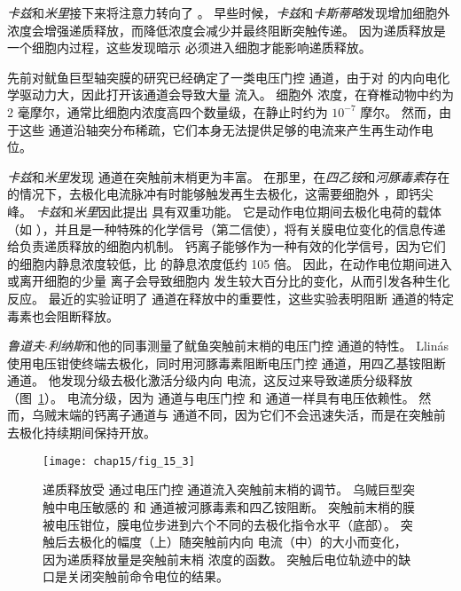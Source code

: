\textit{卡兹}和\textit{米里}接下来将注意力转向了 。
早些时候，\textit{卡兹}和\textit{卡斯蒂略}发现增加细胞外  浓度会增强递质释放，而降低浓度会减少并最终阻断突触传递。
因为递质释放是一个细胞内过程，这些发现暗示  必须进入细胞才能影响递质释放。


先前对鱿鱼巨型轴突膜的研究已经确定了一类电压门控  通道，由于对  的内向电化学驱动力大，因此打开该通道会导致大量  流入。
细胞外  浓度，在脊椎动物中约为 2 毫摩尔，通常比细胞内浓度高四个数量级，在静止时约为 $10^{-7}$ 摩尔。
然而，由于这些  通道沿轴突分布稀疏，它们本身无法提供足够的电流来产生再生动作电位。


\textit{卡兹}和\textit{米里}发现  通道在突触前末梢更为丰富。
在那里，在\textit{四乙铵}和\textit{河豚毒素}存在的情况下，去极化电流脉冲有时能够触发再生去极化，这需要细胞外 ，即钙尖峰。
\textit{卡兹}和\textit{米里}因此提出  具有双重功能。
它是动作电位期间去极化电荷的载体（如 ），并且是一种特殊的化学信号（第二信使），将有关膜电位变化的信息传递给负责递质释放的细胞内机制。
钙离子能够作为一种有效的化学信号，因为它们的细胞内静息浓度较低，比  的静息浓度低约 105 倍。
因此，在动作电位期间进入或离开细胞的少量  离子会导致细胞内  发生较大百分比的变化，从而引发各种生化反应。
最近的实验证明了  通道在释放中的重要性，这些实验表明阻断  通道的特定毒素也会阻断释放。


\textit{鲁道夫$\cdot$利纳斯}和他的同事测量了鱿鱼突触前末梢的电压门控  通道的特性。
Llinás 使用电压钳使终端去极化，同时用河豚毒素阻断电压门控  通道，用四乙基铵阻断  通道。
他发现分级去极化激活分级内向  电流，这反过来导致递质分级释放（图~\ref{fig:15_3}）。
 电流分级，因为  通道与电压门控  和  通道一样具有电压依赖性。
然而，乌贼末端的钙离子通道与  通道不同，因为它们不会迅速失活，而是在突触前去极化持续期间保持开放。


\begin{figure}[htbp]
	\centering
	\texttt{[image: chap15/fig\_15\_3]}
	\caption{递质释放受  通过电压门控  通道流入突触前末梢的调节。
	乌贼巨型突触中电压敏感的  和  通道被河豚毒素和四乙铵阻断。
	突触前末梢的膜被电压钳位，膜电位步进到六个不同的去极化指令水平（底部）。
	突触后去极化的幅度（上）随突触前内向  电流（中）的大小而变化，因为递质释放量是突触前末梢  浓度的函数。
	突触后电位轨迹中的缺口是关闭突触前命令电位的结果\cite{llinas1977depolarization}。}
	\label{fig:15_3}
\end{figure}


